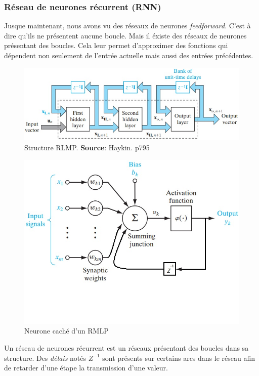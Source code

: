 \subsubsection{Réseau de neurones récurrent (RNN)}
Jusque maintenant, nous avons vu des réseaux de neurones \emph{feedforward}.
C'est à dire qu'ils ne présentent aucune boucle. Mais il éxiste des réseaux de neurones présentant des boucles.
Cela leur permet d'approximer des fonctions qui dépendent non seulement de l'entrée actuelle mais aussi des entrées précédentes.
\begin{figure}
 \centering
 \includegraphics[scale=0.5]{../figures/structurermlp.jpg}
 \caption{Structure RLMP. \textbf{Source}: Haykin. p795\cite{Haykin}}
 \label{structurermlp}
\end{figure}
\begin{figure}
 \centering
 \includegraphics[scale=0.5]{../figures/neuronermlp.jpg}
 \caption{Neurone caché d'un RMLP}
 \label{neuronermlp}
\end{figure}
Un réseau de neurones récurrent est un réseaux présentant des boucles dans sa structure.
Des \emph{délais} notés $Z^{-1}$ sont présents sur certains arcs dans le réseau afin de retarder d'une étape la transmission d'une valeur.
